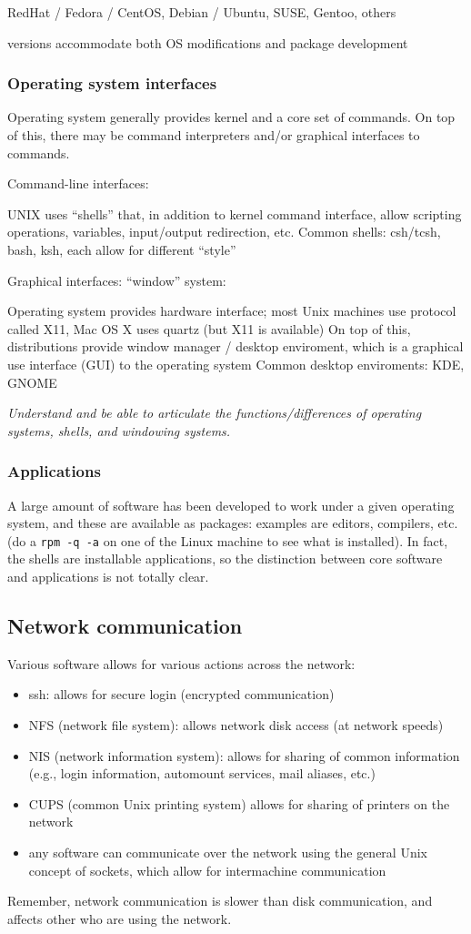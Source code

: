 \documentclass{article}
\newcommand{\test}[1]{%
    \begin{center}
        \colorbox{hl}{\parbox{0.9\textwidth}{\emph{\centering #1}}}
    \end{center}}
\begin{document}
RedHat / Fedora / CentOS, Debian / Ubuntu, SUSE, Gentoo, others

versions accommodate both OS modifications and package development
\subsubsection{Operating system interfaces}
Operating system generally provides kernel and a core set of commands.
On top of this, there may be command interpreters and/or graphical
interfaces to commands.

Command-line interfaces:

UNIX uses ``shells'' that, in addition to kernel command interface,
allow scripting operations, variables, input/output redirection, etc.
Common shells: csh/tcsh, bash, ksh, each allow for different ``style''

Graphical interfaces: ``window'' system:

Operating system provides hardware interface; most Unix machines use
protocol called X11, Mac OS X uses quartz (but X11 is available)
On top of this, distributions provide window manager / desktop
enviroment, which is a graphical use interface (GUI) to the operating
system
Common desktop enviroments: KDE, GNOME

\test{Understand and be able to articulate the functions/differences
of operating systems, shells, and windowing systems.}

\subsubsection{Applications}
A large amount of software has been developed to work under a given
operating system, and these are available as packages: examples are
editors, compilers, etc. (do a \texttt{rpm -q -a} on one of the Linux machine
to see what is installed). In fact, the shells are installable
applications, so the distinction between core software and
applications is not totally clear.

\subsection{Network communication}
Various software allows for various actions across the network:
\begin{itemize}
    \item ssh: allows for secure login (encrypted communication)
    \item NFS (network file system): allows network disk access
        (at network speeds)
    \item NIS (network information system): allows for sharing of common
        information (e.g., login information, automount services, mail
        aliases, etc.)
    \item CUPS (common Unix printing system) allows for sharing of printers on
        the network
    \item any software can communicate over the network using the general Unix
        concept of sockets, which allow for intermachine communication
\end{itemize}
Remember, network communication is slower than disk communication, and
affects other who are using the network.
\end{document}
